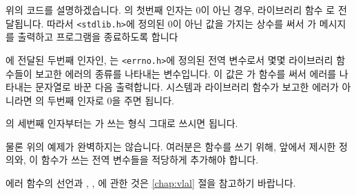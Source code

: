 \begin{faq}
	\noindent 위의 코드를 설명하겠습니다.
        의 첫번째 인자는 0이 아닌 경우, 
	라이브러리 함수 로 전달됩니다.  따라서 
	\verb+<stdlib.h>+에 정의된 0이 아닌 값을 가지는 
	 상수를 써서 가 메시지를
	출력하고 프로그램을 종료하도록 합니다

	에 전달된 두번째 인자인, 
        는 \verb+<errno.h>+에 정의된 전역 변수로서
        몇몇 라이브러리 함수들이 보고한 에러의 종류를 나타내는
	변수입니다.  이 값은 가  함수를
        써서 에러를 나타내는 문자열로 바꾼 다음 출력합니다.
        시스템과 라이브러리 함수가 보고한 에러가 아니라면
	의 두번째 인자로 0을 주면 됩니다.

	의 세번째 인자부터는 가 쓰는
	형식 그대로 쓰시면 됩니다.

	물론 위의 예제가 완벽하지는 않습니다.  여러분은 
	함수를 쓰기 위해, 앞에서 제시한  정의와,
	이 함수가 쓰는 전역 변수들을 적당하게 추가해야 합니다.
	
	에러 함수의 선언과 , , 에
	관한 것은 \ref{chap:vlal} 절을 참고하기 바랍니다.

\R
	\cite{glibc} 
\end{faq}

